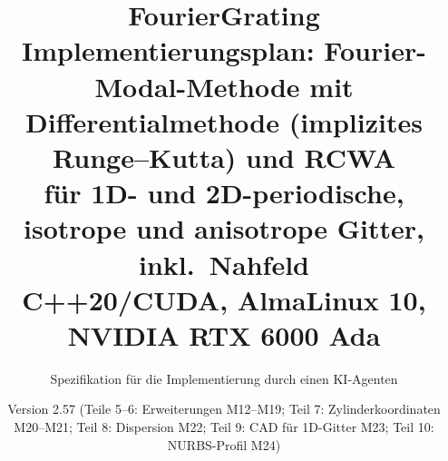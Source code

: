 \documentclass[10pt,a4paper]{article}
\title{\textbf{FourierGrating}\\[4pt]\large Implementierungsplan: Fourier-Modal-Methode mit
Differentialmethode (implizites Runge--Kutta) und RCWA\\ für 1D- und 2D-periodische, isotrope und
anisotrope Gitter, inkl.\ Nahfeld\\[4pt]\normalsize C++20/CUDA, AlmaLinux 10, NVIDIA RTX 6000 Ada}
\author{Spezifikation für die Implementierung durch einen KI-Agenten}
\date{Version 2.57 (Teile 5--6: Erweiterungen M12--M19; Teil 7: Zylinderkoordinaten M20--M21; Teil 8: Dispersion M22; Teil 9: CAD für 1D-Gitter M23; Teil 10: NURBS-Profil M24)}
\begin{document}
\maketitle
\tableofcontents
\clearpage




{\sloppy






}
\end{document}
